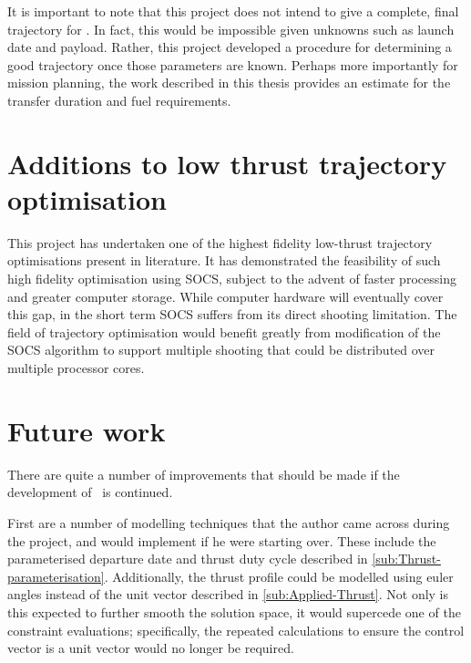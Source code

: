 It is important to note that this project does not intend to give a complete, final trajectory for \BW. In fact, this would be impossible given unknowns such as launch date and payload. Rather, this project developed a procedure for determining a good trajectory once those parameters are known. Perhaps more importantly for mission planning, the work described in this thesis provides an estimate for the transfer duration and fuel requirements.







\section{Additions to low thrust trajectory optimisation} \label{sec:Optimisation-additions}

This project has undertaken one of the highest fidelity low-thrust trajectory optimisations present in literature. It has  demonstrated the feasibility of such high fidelity optimisation using SOCS, subject to the advent of faster processing and greater computer storage. While computer hardware will eventually cover this gap, in the short term SOCS suffers from its direct shooting limitation. The field of trajectory optimisation would benefit greatly from modification of the SOCS algorithm to support multiple shooting that could be distributed over multiple processor cores.







\section{Future work} \label{sec:Future-work}

There are quite a number of improvements that should be made if the development of \BW\ is continued. 

First are a number of modelling techniques that the author came across during the project, and would implement if he were starting over. These include the parameterised departure date and thrust duty cycle described in \autoref{sub:Thrust-parameterisation}. Additionally, the thrust profile could be modelled using euler angles instead of the unit vector described in \autoref{sub:Applied-Thrust}. Not only is this expected to further smooth the solution space, it would supercede one of the constraint evaluations; specifically, the repeated calculations to ensure the control vector is  a unit vector would no longer be required.

